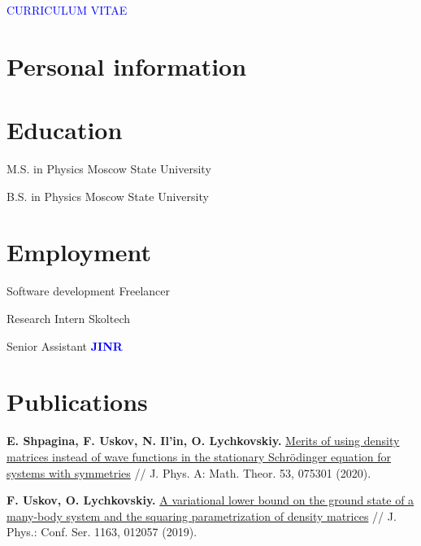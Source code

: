 \documentclass[10pt,a4paper,sans]{moderncv}
\begin{document}

\begin{center}
\textcolor{blue}{\Large CURRICULUM VITAE}
\end{center}

\section{Personal information}

	


\section{Education}


{M.S. in Physics}
{}
{Moscow State University}
{}{}

{B.S. in Physics}
{}
{Moscow State University}
{}{}


\section{Employment}
	{Software development}{}
	{Freelancer}{}{}

	{Research Intern}{}
	{Skoltech}{}{}

	{Senior Assistant}{}
	{\textbf{\textcolor{blue}{JINR}}}{}{}

\section{Publications}
	{\textbf{E. Shpagina, F. Uskov, N. Il'in, O. Lychkovskiy.}
	{\textcolor{blue}{\href{https://doi.org/10.1088/1751-8121/ab64a1}{Merits of using density matrices instead of wave functions in the stationary Schr\"odinger equation for systems with symmetries}}} //  J. Phys. A: Math. Theor. 53, 075301 (2020).}

	{\textbf{F. Uskov, O. Lychkovskiy.}
	{\textcolor{blue}{\href{https://doi.org/10.1088/1742-6596/1163/1/012057}{A variational lower bound on the ground state of a many-body system and the squaring parametrization of density matrices}}} // J. Phys.: Conf. Ser. 1163, 012057 (2019).}
\end{document}
